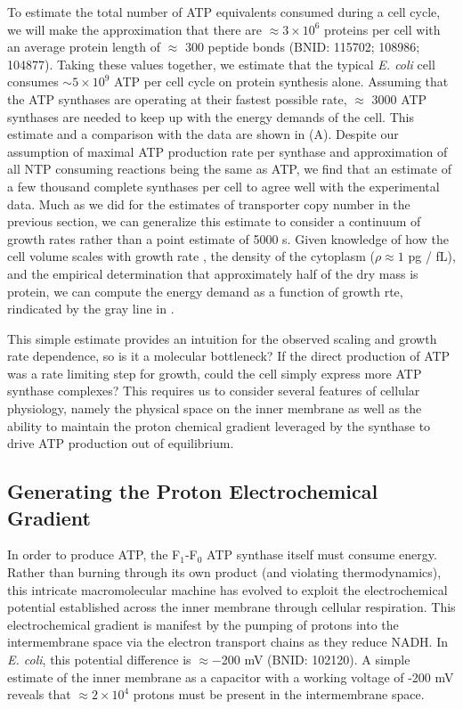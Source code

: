 To estimate the total number of ATP equivalents consumed during a cell cycle,
we will make the approximation that there are $\approx 3\times10^6$ proteins
per cell with an average protein length of $\approx$ 300 peptide bonds (BNID:
115702; 108986; 104877). Taking these values together, we
estimate that the typical \textit{E. coli} cell consumes $\sim 5 \times
10^9$ ATP per cell cycle on protein synthesis alone. Assuming that the ATP synthases are operating at their
fastest possible rate, $\approx$ 3000 ATP synthases are needed to keep up
with the energy demands of the cell. This estimate and a comparison with the
data are shown in  (A). Despite our assumption of
maximal ATP production rate per synthase and approximation of all NTP
consuming reactions being the same as ATP, we find that an estimate of a few
thousand complete synthases per cell to agree well with the experimental
data. Much as we did for the estimates of transporter copy number in the
previous section, we can generalize this estimate to consider a continuum of growth rates rather than a
point estimate of 5000 s. Given knowledge of how the cell volume scales with
growth rate \citep{si2017}, the density of the cytoplasm ($\rho \approx 1$ pg /
fL), and the empirical determination that approximately half of the dry mass is
protein, we can compute the energy demand as a function of growth rte, rindicated by the gray line in
.

This simple estimate provides an intuition for the observed scaling
and growth rate dependence, so is it a molecular bottleneck? If the
direct production of ATP was a rate limiting step for growth, could the cell
simply express more ATP synthase complexes? This requires us to consider
several features of cellular physiology, namely the physical space on the
inner membrane as well as the ability to maintain the proton chemical
gradient leveraged by the synthase to drive ATP production out of
equilibrium.

\subsection{Generating the Proton Electrochemical Gradient} In order to
produce ATP, the F$_1$-F$_0$ ATP synthase itself must consume energy. Rather
than burning through its own product (and violating thermodynamics), this
intricate macromolecular machine has evolved to exploit the electrochemical
potential established across the inner membrane through cellular respiration.
This electrochemical gradient is manifest by the pumping of protons into the
intermembrane space via the electron transport chains as they reduce NADH. In
\textit{E. coli}, this potential difference is $\approx -$200 mV (BNID:
102120). A simple estimate of the inner membrane as a capacitor with a
working voltage of -200 mV reveals that $\approx 2\times 10^4$ protons must
be present in the intermembrane space.

